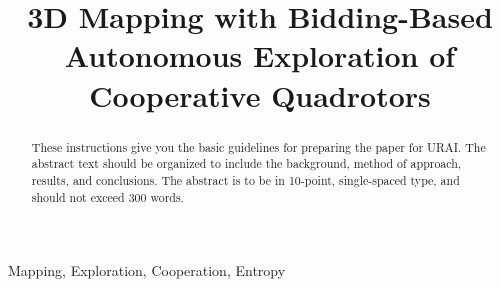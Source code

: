 \documentclass[conference]{IEEEURAI}
\begin{document}
%
\title{3D Mapping with Bidding-Based Autonomous Exploration of Cooperative Quadrotors}


\author{
}

\maketitle

\begin{abstract}
These instructions give you the basic guidelines for preparing the paper for URAI. The abstract text should be organized to include the background, method of approach, results, and conclusions. The abstract is to be in 10-point, single-spaced type, and should not exceed 300 words.\\
\end{abstract}

\begin{IEEEkeywords}
Mapping, Exploration, Cooperation, Entropy
\end{IEEEkeywords}




%
\IEEEpeerreviewmaketitle
\end{document}
